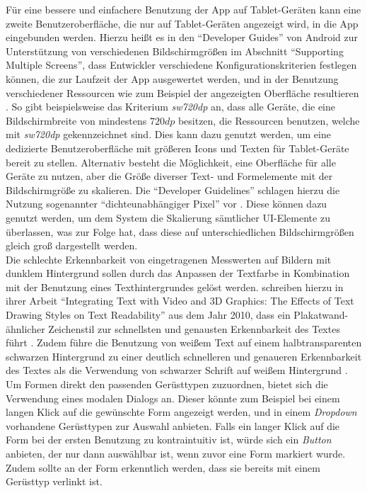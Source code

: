 Für eine bessere und einfachere Benutzung der App auf Tablet-Geräten kann eine zweite Benutzeroberfläche, die nur auf Tablet-Geräten angezeigt wird, in die App eingebunden werden. 
Hierzu heißt es in  den ``Developer Guides'' von Android zur Unterstützung von verschiedenen Bildschirmgrößen im Abschnitt ``Supporting Multiple Screens'', dass Entwickler verschiedene Konfigurationskriterien festlegen können, die zur Laufzeit der App ausgewertet werden, und in der Benutzung verschiedener Ressourcen wie zum Beispiel der angezeigten Oberfläche resultieren \citep[How to Support Multiple Screens]{SS18}.
So gibt beispielsweise das Kriterium \emph{sw720dp} an, dass alle Geräte, die eine Bildschirmbreite von mindestens $720dp$ besitzen, die Ressourcen benutzen, welche mit \emph{sw720dp} gekennzeichnet sind.
Dies kann dazu genutzt werden, um eine dedizierte Benutzeroberfläche mit größeren Icons und Texten für Tablet-Geräte bereit zu stellen.
Alternativ besteht die Möglichkeit, eine Oberfläche für alle Geräte zu nutzen, aber die Größe diverser Text- und Formelemente mit der Bildschirmgröße zu skalieren.
Die ``Developer Guidelines'' schlagen hierzu die Nutzung sogenannter ``dichteunabhängiger Pixel'' vor \citep[Density Independence]{SS18}.
Diese können dazu genutzt werden, um dem System die Skalierung sämtlicher UI-Elemente zu überlassen, was zur Folge hat, dass diese auf unterschiedlichen Bildschirmgrößen gleich groß dargestellt werden.
\\

Die schlechte Erkennbarkeit von eingetragenen Messwerten auf Bildern mit dunklem Hintergrund sollen durch das Anpassen der Textfarbe in Kombination mit der Benutzung eines Texthintergrundes gelöst werden.
\citeauthor{Jankowski10} schreiben hierzu in ihrer Arbeit ``Integrating Text with Video and 3D Graphics: The Effects of Text Drawing Styles on Text Readability'' aus dem Jahr 2010, dass ein Plakatwand-ähnlicher Zeichenstil zur schnellsten und genausten Erkennbarkeit des Textes führt \citep[Seite 1330]{Jankowski10}.
Zudem führe die Benutzung von weißem Text auf einem halbtransparenten schwarzen Hintergrund zu einer deutlich schnelleren und genaueren Erkennbarkeit des Textes als die Verwendung von schwarzer Schrift auf weißem Hintergrund \citep[Seite 1328]{Jankowski10}. \\

Um Formen direkt den passenden Gerüsttypen zuzuordnen, bietet sich die Verwendung eines modalen Dialogs an.
Dieser könnte zum Beispiel bei einem langen Klick auf die gewünschte Form angezeigt werden, und in einem \emph{Dropdown} vorhandene Gerüsttypen zur Auswahl anbieten.
Falls ein langer Klick auf die Form bei der ersten Benutzung zu kontraintuitiv ist, würde sich ein \emph{Button} anbieten, der nur dann auswählbar ist, wenn zuvor eine Form markiert wurde.
Zudem sollte an der Form erkenntlich werden, dass sie bereits mit einem Gerüsttyp verlinkt ist. \\

